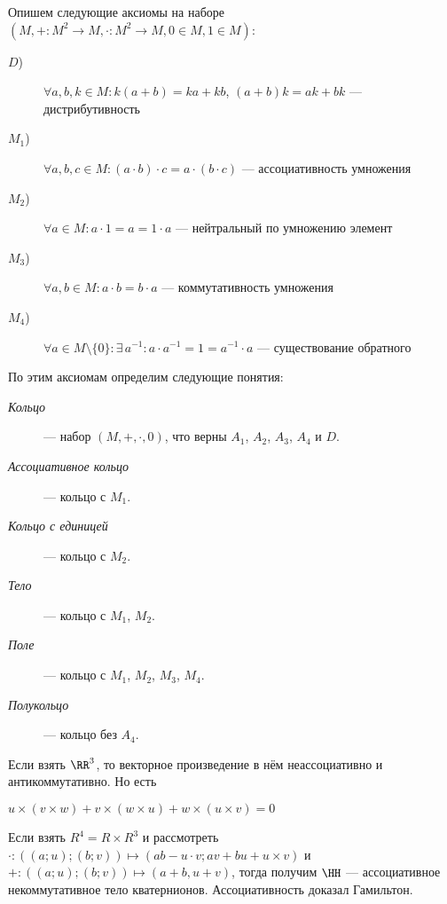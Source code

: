 \documentclass[12pt,a4paper]{article}
\begin{document}
    \begin{definition} Опишем следующие аксиомы на наборе $(M, +: M^2 \to M, \cdot: M^2 \to M, 0 \in M, 1 \in M)$:
        \begin{description}
            \item[$D$)] $\forall a, b, k \in M: k(a + b) = ka + kb$, $(a + b)k = ak + bk$ --- дистрибутивность
            \item[$M_1$)] $\forall a, b, c \in M: (a \cdot b) \cdot c = a \cdot (b \cdot c)$ --- ассоциативность умножения
            \item[$M_2$)] $\forall a \in M: a \cdot 1 = a = 1 \cdot a$ --- нейтральный по умножению элемент
            \item[$M_3$)] $\forall a, b \in M: a \cdot b = b \cdot a$ --- коммутативность умножения
            \item[$M_4$)] $\forall a \in M \setminus \{0\}: \exists\, a^{-1}: a \cdot a^{-1} = 1 = a^{-1} \cdot a$ --- существование обратного
        \end{description}
        По этим аксиомам определим следующие понятия:
        \begin{description}
            \item[\emph{Кольцо}] --- набор $(M, +, \cdot, 0)$, что верны $A_1$, $A_2$, $A_3$, $A_4$ и $D$.
            \item[\emph{Ассоциативное кольцо}] --- кольцо с $M_1$.
            \item[\emph{Кольцо с единицей}] --- кольцо с $M_2$.
            \item[\emph{Тело}] --- кольцо с $M_1$, $M_2$.
            \item[\emph{Поле}] --- кольцо с $M_1$, $M_2$, $M_3$, $M_4$.
            \item[\emph{Полукольцо}] --- кольцо без $A_4$.
        \end{description}
    \end{definition}

    \begin{example}
        Если взять $\RR^3$, то векторное произведение в нём неассоциативно и антикоммутативно. Но есть
        \begin{lemma*}
            $u\times (v\times w) + v\times (w\times u) + w\times (u\times v) = 0$
        \end{lemma*}
    \end{example}

    \begin{example}
        Если взять $R^4 = R \times R^3$ и рассмотреть $\cdot: ((a; u); (b; v)) \mapsto (ab-u\cdot v; av + bu + u\times v)$ и $+: ((a; u); (b; v)) \mapsto (a + b, u + v)$, тогда получим $\HH$ --- ассоциативное некоммутативное тело кватернионов. Ассоциативность доказал Гамильтон.
    \end{example}
\end{document}
